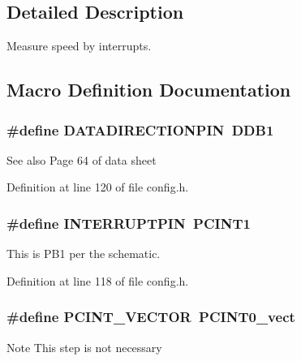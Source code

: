 \subsection{Detailed Description}
Measure speed by interrupts. 



\subsection{Macro Definition Documentation}
\subsubsection[{\texorpdfstring{D\+A\+T\+A\+D\+I\+R\+E\+C\+T\+I\+O\+N\+P\+IN}{DATADIRECTIONPIN}}]{\setlength{\rightskip}{0pt plus 5cm}\#define D\+A\+T\+A\+D\+I\+R\+E\+C\+T\+I\+O\+N\+P\+IN~D\+D\+B1}\hypertarget{group__speed_ga9142f4c677315955ad0ac6266b615d2c}{}\label{group__speed_ga9142f4c677315955ad0ac6266b615d2c}
\begin{DoxySeeAlso}{See also}
Page 64 of data sheet 
\end{DoxySeeAlso}


Definition at line 120 of file config.\+h.

\subsubsection[{\texorpdfstring{I\+N\+T\+E\+R\+R\+U\+P\+T\+P\+IN}{INTERRUPTPIN}}]{\setlength{\rightskip}{0pt plus 5cm}\#define I\+N\+T\+E\+R\+R\+U\+P\+T\+P\+IN~P\+C\+I\+N\+T1}\hypertarget{group__speed_ga984097794e94beb18c01b6fcbd8f399d}{}\label{group__speed_ga984097794e94beb18c01b6fcbd8f399d}


This is P\+B1 per the schematic. 



Definition at line 118 of file config.\+h.

\subsubsection[{\texorpdfstring{P\+C\+I\+N\+T\+\_\+\+V\+E\+C\+T\+OR}{PCINT_VECTOR}}]{\setlength{\rightskip}{0pt plus 5cm}\#define P\+C\+I\+N\+T\+\_\+\+V\+E\+C\+T\+OR~P\+C\+I\+N\+T0\+\_\+vect}\hypertarget{group__speed_ga77b45027297b1ff40b5b1249afb852e5}{}\label{group__speed_ga77b45027297b1ff40b5b1249afb852e5}
\begin{DoxyNote}{Note}
This step is not necessary 
\end{DoxyNote}


